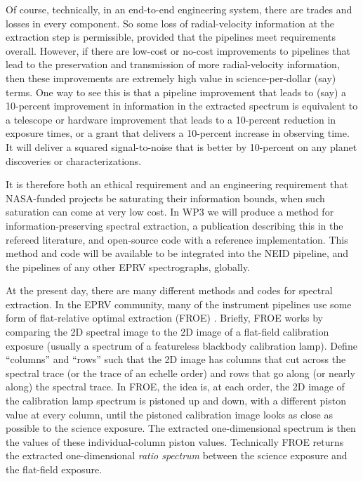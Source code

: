 \documentclass[12pt]{article}
\begin{document}
Of course, technically, in an end-to-end engineering system, there are trades and losses in every component.
So some loss of radial-velocity information at the extraction step is permissible, provided that the pipelines meet requirements overall.
However, if there are low-cost or no-cost improvements to pipelines that lead to the preservation and transmission of more radial-velocity information, then these improvements are extremely high value in science-per-dollar (say) terms.
One way to see this is that a pipeline improvement that leads to (say) a 10-percent improvement in information in the extracted spectrum is equivalent to a telescope or hardware improvement that leads to a 10-percent reduction in exposure times, or a grant that delivers a 10-percent increase in observing time.
It will deliver a squared signal-to-noise that is better by 10-percent on any planet discoveries or characterizations.

It is therefore both an ethical requirement and an engineering requirement that NASA-funded projects be saturating their information bounds, when such saturation can come at very low cost.
In WP3 we will produce a method for information-preserving spectral extraction, a publication describing this in the refereed literature, and open-source code with a reference implementation.
This method and code will be available to be integrated into the NEID pipeline, and the pipelines of any other EPRV spectrographs, globally.

At the present day, there are many different methods and codes for spectral extraction.
In the EPRV community, many of the instrument pipelines use some form of flat-relative optimal extraction (FROE) \cite{froe}.
Briefly, FROE works by comparing the 2D spectral image to the 2D image of a flat-field calibration exposure (usually a spectrum of a featureless blackbody calibration lamp).
Define ``columns'' and ``rows'' such that the 2D image has columns that cut across the spectral trace (or the trace of an echelle order) and rows that go along (or nearly along) the spectral trace.
In FROE, the idea is, at each order, the 2D image of the calibration lamp spectrum is pistoned up and down, with a different piston value at every column, until the pistoned calibration image looks as close as possible to the science exposure.
The extracted one-dimensional spectrum is then the values of these individual-column piston values.
Technically FROE returns the extracted one-dimensional \emph{ratio spectrum} between the science exposure and the flat-field exposure.
\end{document}
